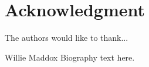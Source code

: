 \documentclass[12pt,journal,compsoc]{IEEEtran}
\begin{document}
  \section*{Acknowledgment}
\fi

The authors would like to thank...


\ifCLASSOPTIONcaptionsoff
  \newpage
\fi





%

% 

\begin{IEEEbiography}{Willie Maddox}
Biography text here.
\end{IEEEbiography}
\end{document}
